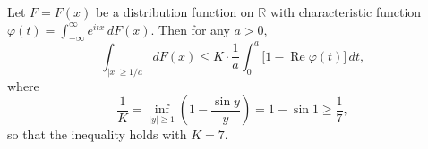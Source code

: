 Let $F = F(x)$ be a distribution function on $\mathbb{R}$ with characteristic function $\varphi(t) = \int_{-\infty}^{\infty} e^{itx} \, dF(x)$. Then for any $a > 0$,
$$\int_{|x| \geq 1/a} dF(x) \leq K \cdot \frac{1}{a} \int_{0}^{a} \bigl[ 1 - \operatorname{Re} \varphi(t) \bigr] \, dt,$$
where
$$\frac{1}{K} = \inf_{|y| \geq 1} \left( 1 - \frac{\sin y}{y} \right) = 1 - \sin 1 \geq \frac{1}{7},$$
so that the inequality holds with $K = 7$.
